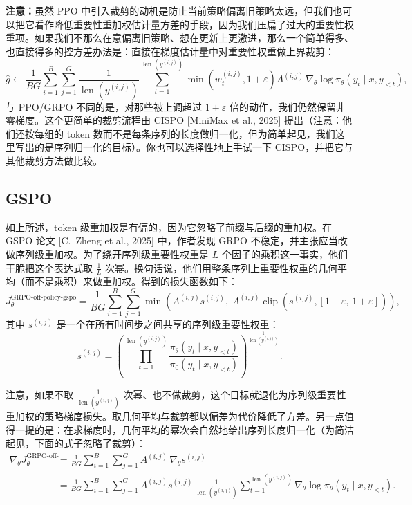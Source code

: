 \textbf{注意：}虽然 PPO 中引入裁剪的动机是防止当前策略偏离旧策略太远，但我们也可以把它看作降低重要性重加权估计量方差的手段，因为我们压扁了过大的重要性权重项。如果我们不那么在意偏离旧策略、想在更新上更激进，那么一个简单得多、也直接得多的控方差办法是：直接在梯度估计量中对重要性权重做上界裁剪：
\begin{equation}
\hat{g} \leftarrow \frac{1}{BG}\sum_{i=1}^{B}\sum_{j=1}^{G}\frac{1}{\operatorname{len}\!\left(y^{(i,j)}\right)}\sum_{t=1}^{\operatorname{len}\!\left(y^{(i,j)}\right)} \min\!\left(w_t^{(i,j)}, 1+\varepsilon\right)A^{(i,j)}\,\nabla_\theta \log \pi_\theta(y_t \mid x, y_{<t}),
\end{equation}
与 PPO/GRPO 不同的是，对那些被上调超过 $1+\varepsilon$ 倍的动作，我们仍然保留非零梯度。这个更简单的裁剪流程由 CISPO [MiniMax et al., 2025] 提出（注意：他们还按每组的 token 数而不是每条序列的长度做归一化，但为简单起见，我们这里写出的是序列归一化的目标）。你也可以选择性地上手试一下 CISPO，并把它与其他裁剪方法做比较。

\subsection{GSPO}

如上所述，token 级重加权是有偏的，因为它忽略了前缀与后缀的重加权。在 GSPO 论文 [C.\ Zheng et al., 2025] 中，作者发现 GRPO 不稳定，并主张应当改做序列级重加权。为了绕开序列级重要性权重是 $L$ 个因子的乘积这一事实，他们干脆把这个表达式取 $\frac{1}{L}$ 次幂。换句话说，他们用整条序列上重要性权重的几何平均（而不是乘积）来做重加权。得到的损失函数如下：
\begin{equation}
J_\theta^{\text{GRPO-off-policy-gspo}} = \frac{1}{BG}\sum_{i=1}^{B}\sum_{j=1}^{G}\min\!\left(A^{(i,j)}s^{(i,j)},\; A^{(i,j)}\operatorname{clip}\!\left(s^{(i,j)}, [1-\varepsilon,\, 1+\varepsilon]\right)\right),
\end{equation}
其中 $s^{(i,j)}$ 是一个在所有时间步之间共享的序列级重要性权重：
\begin{equation}
s^{(i,j)} = \left(\prod_{t=1}^{\operatorname{len}\!\left(y^{(i,j)}\right)} \frac{\pi_\theta(y_t \mid x, y_{<t})}{\pi_0(y_t \mid x, y_{<t})}\right)^{\frac{1}{\operatorname{len}\!\left(y^{(i,j)}\right)}}.
\end{equation}

注意，如果不取 $\frac{1}{\operatorname{len}\left(y^{(i,j)}\right)}$ 次幂、也不做裁剪，这个目标就退化为序列级重要性重加权的策略梯度损失。取几何平均与裁剪都以偏差为代价降低了方差。另一点值得一提的是：在求梯度时，几何平均的幂次会自然地给出序列长度归一化（为简洁起见，下面的式子忽略了裁剪）：
\begin{align}
\nabla_\theta J_\theta^{\text{GRPO-off-policy-gspo}} &= \frac{1}{BG}\sum_{i=1}^{B}\sum_{j=1}^{G} A^{(i,j)}\,\nabla_\theta s^{(i,j)} \nonumber\\
&= \frac{1}{BG}\sum_{i=1}^{B}\sum_{j=1}^{G} A^{(i,j)}s^{(i,j)}\,\frac{1}{\operatorname{len}\!\left(y^{(i,j)}\right)}\sum_{t=1}^{\operatorname{len}\!\left(y^{(i,j)}\right)} \nabla_\theta \log \pi_\theta(y_t \mid x, y_{<t}).
\end{align}

